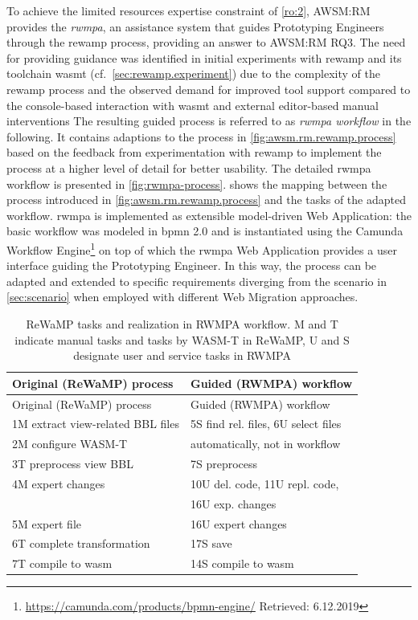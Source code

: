 To achieve the limited resources expertise constraint of \cref{ro:2}, AWSM:RM provides the \emph{\gls{rwmpa}}, an assistance system that guides Prototyping Engineers through the \gls{rewamp} process, providing an answer to AWSM:RM RQ3.
The need for providing guidance was identified in initial experiments with \gls{rewamp} and its toolchain \gls{wasmt} (cf.~\cref{sec:rewamp.experiment}) due to the complexity of the \gls{rewamp} process and the observed demand for improved tool support compared to the console-based interaction with \gls{wasmt} and external editor-based manual interventions
The resulting guided process is referred to as \emph{\gls{rwmpa} workflow} in the following.
It contains adaptions to the process in \cref{fig:awsm.rm.rewamp.process} based on the feedback from experimentation with \gls{rewamp} to implement the process at a higher level of detail for better usability.
The detailed \gls{rwmpa} workflow is presented in \cref{fig:rwmpa-process}. 
 shows the mapping between the process introduced in \cref{fig:awsm.rm.rewamp.process} and the tasks of the adapted workflow.
\gls{rwmpa} is implemented as extensible model-driven \gls{Web Application}: the basic workflow was modeled in \gls{bpmn} 2.0 and is instantiated using the Camunda Workflow Engine\footnote{\url{https://camunda.com/products/bpmn-engine/} Retrieved: 6.12.2019} on top of which the \gls{rwmpa} \gls{Web Application} provides a  user interface guiding the Prototyping Engineer.
In this way, the process can be adapted and extended to specific requirements diverging from the scenario in \cref{sec:scenario} when employed with different \gls{Web Migration} approaches.

\hypertarget{tbl:rewamp-rwmpa}{}
\begin{xltabular}{\linewidth}[hbt]{@{}ll@{}}
\caption[ReWaMP tasks and realization in RWMPA workflow]{\label{tbl:rewamp-rwmpa}ReWaMP tasks and realization in RWMPA workflow.
M and T indicate manual tasks and tasks by WASM-T in ReWaMP, U and S designate user and service tasks in RWMPA}\tabularnewline
\toprule
Original (ReWaMP) process & Guided (RWMPA) workflow\tabularnewline
\midrule
\endfirsthead
\toprule
Original (ReWaMP) process & Guided (RWMPA) workflow\tabularnewline
\midrule
\endhead
1M extract view-related BBL files & 5S find rel. files, 6U select files\tabularnewline
2M configure WASM-T & automatically, not in workflow\tabularnewline
3T preprocess view BBL & 7S preprocess\tabularnewline
4M expert changes & 10U del.
code, 11U repl.
code,\tabularnewline
 & 16U exp.
changes\tabularnewline
5M expert file & 16U expert changes\tabularnewline
6T complete transformation & 17S save\tabularnewline
7T compile to \gls{wasm} & 14S compile to \gls{wasm}\tabularnewline
\bottomrule
\end{xltabular}

